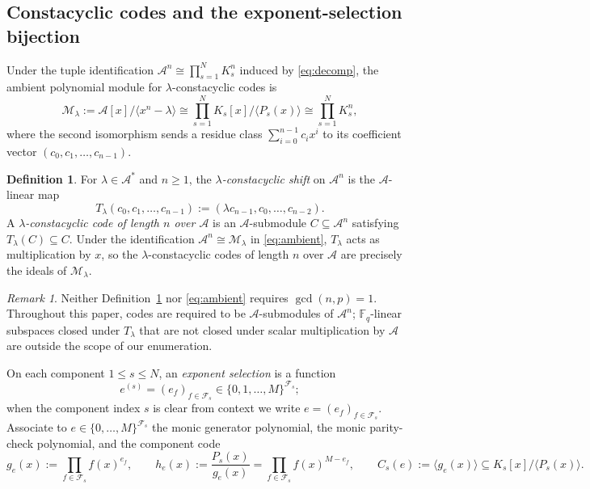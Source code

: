 \documentclass[preprint,12pt]{elsarticle}
\newcommand{\F}{\mathbb F}
\newcommand{\A}{\mathcal A}
\newcommand{\Fs}{\mathcal F_s}
\numberwithin{equation}{section}
\theoremstyle{plain}
\theoremstyle{definition}
\newtheorem{definition}[theorem]{Definition}
\theoremstyle{remark}
\newtheorem{remark}[theorem]{Remark}
\begin{document}
\subsection{Constacyclic codes and the exponent-selection bijection}\label{sec:selections}

Under the tuple identification $\A^n\cong\prod_{s=1}^{N}K_s^n$ induced by
\eqref{eq:decomp}, the ambient polynomial module for $\lambda$-constacyclic
codes is
\begin{equation}\label{eq:ambient}
\mathcal M_\lambda:=\A[x]/\langle x^n-\lambda\rangle
 \cong\prod_{s=1}^{N}K_s[x]/\langle P_s(x)\rangle
 \cong\prod_{s=1}^{N}K_s^n,
\end{equation}
where the second isomorphism sends a residue class $\sum_{i=0}^{n-1}c_ix^i$ to
its coefficient vector $(c_0,c_1,\dots,c_{n-1})$.

\begin{definition}\label{def:constacyclic-A}
For $\lambda\in\A^*$ and $n\ge 1$, the \emph{$\lambda$-constacyclic shift} on
$\A^n$ is the $\A$-linear map
\[
T_\lambda(c_0,c_1,\dots,c_{n-1}):=(\lambda c_{n-1},c_0,\dots,c_{n-2}).
\]
A \emph{$\lambda$-constacyclic code of length $n$ over $\A$} is an
$\A$-submodule $C\subseteq\A^n$ satisfying $T_\lambda(C)\subseteq C$. Under the
identification $\A^n\cong\mathcal M_\lambda$ in \eqref{eq:ambient}, $T_\lambda$
acts as multiplication by $x$, so the $\lambda$-constacyclic codes of length $n$
over $\A$ are precisely the ideals of $\mathcal M_\lambda$.
\end{definition}

\begin{remark}\label{rem:A-linear}
Neither Definition~\ref{def:constacyclic-A} nor \eqref{eq:ambient} requires
$\gcd(n,p)=1$. Throughout this paper, codes are required to be
$\A$-submodules of $\A^n$; $\F_q$-linear subspaces closed under $T_\lambda$ that
are not closed under scalar multiplication by $\A$ are outside the scope of our
enumeration.
\end{remark}

On each component $1\le s\le N$, an \emph{exponent selection} is a function
\[
e^{(s)}=(e_f)_{f\in\Fs}\in\{0,1,\dots,M\}^{\Fs};
\]
when the component index $s$ is clear from context we write $e=(e_f)_{f\in\Fs}$.
Associate to $e\in\{0,\dots,M\}^{\Fs}$ the monic generator polynomial, the monic
parity-check polynomial, and the component code
\begin{equation}\label{eq:gen-check}
g_e(x):=\prod_{f\in\Fs} f(x)^{e_f},
\qquad
h_e(x):=\frac{P_s(x)}{g_e(x)}=\prod_{f\in\Fs} f(x)^{M-e_f},
\qquad
C_s(e):=\langle g_e(x)\rangle\subseteq K_s[x]/\langle P_s(x)\rangle.
\end{equation}
\end{document}
